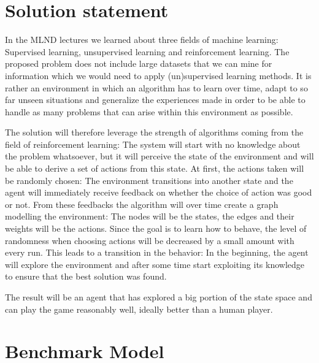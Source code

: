 \documentclass[a4paper,10pt]{article}
\begin{document}
\section{Solution statement}
% 
In the MLND lectures we learned about three fields of machine learning: Supervised learning, unsupervised learning and reinforcement learning.
The proposed problem does not include large datasets that we can mine for information which we would need to apply (un)supervised learning methods. 
It is rather an environment in which an algorithm has to learn over time, adapt to so far unseen  situations and generalize the experiences made in order to be able to handle as many problems that can arise within this environment as possible.

The solution will therefore leverage the strength of algorithms coming from the field of reinforcement learning:
The system will start with no knowledge about the problem whatsoever, but it will perceive the state of the environment and will be able to derive a set of actions from this state.
At first, the actions taken will be randomly chosen: 
The environment transitions into another state and the agent will immediately receive feedback on whether the choice of action was good or not.
From these feedbacks the algorithm will over time create a graph modelling the environment:
The nodes will be the states, the edges and their weights will be the actions.
Since the goal is to learn how to behave, the level of randomness when choosing actions will be decreased by a small amount with every run.
This leads to a transition in the behavior: In the beginning, the agent will explore the environment and after some time start exploiting its knowledge to ensure that the best solution was found.

The result will be an agent that has explored a big portion of the state space and can play the game reasonably well, ideally better than a human player.


\section{Benchmark Model}
% 
\end{document}
